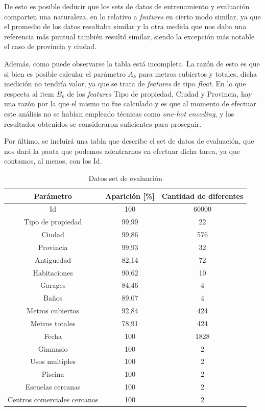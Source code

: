 \documentclass[titlepage,a4paper,11pt]{article}
\begin{document}
De esto es posible deducir que los sets de datos de entrenamiento y evaluación comparten una naturaleza, en lo relativo a \textit{features} en cierto modo similar, ya que el promedio de los datos resultaba similar y la otra medida que nos daba una referencia más puntual también resultó similar, siendo la excepción más notable el caso de provincia y ciudad. 

Además, como puede observarse la tabla está incompleta. La razón de esto es que si bien es posible calcular el parámetro $A_{k}$ para metros cubiertos y totales, dicha medición no tendría valor, ya que se trata de \textit{features} de tipo \textit{float}. En lo que respecta al item $B_{k}$ de los \textit{features} Tipo de propiedad, Ciudad y Provincia, hay una razón por la que el mismo no fue calculado y es que al momento de efectuar este análisis no se habían empleado técnicas como \textit{one-hot encoding}, y los resultados obtenidos se consideraron suficientes para proseguir.

Por último, se incluirá una tabla que describe el set de datos de evaluación, que nos dará la pauta que podemos adentrarnos en efectuar dicha tarea, ya que contamos, al menos, con los Id.

\begin{table}[h]
	\begin{center}
		\begin{tabular}{|c|c|c|}
			\hline
			Parámetro & Aparición [\%] & Cantidad de diferentes \\
			\hline \hline
			Id & 100 & 60000 \\ \hline
			Tipo de propiedad & 99,99 & 22  \\ \hline
			Ciudad  & 99,86 & 576  \\ \hline
			Provincia & 99,93 & 32  \\ \hline
			Antiguedad & 82,14 & 72  \\ \hline
			Habitaciones & 90,62 & 10  \\ \hline
			Garages & 84,46 & 4  \\ \hline
			Baños & 89,07 & 4 \\ \hline
			Metros cubiertos & 92,84 & 424  \\ \hline
			Metros totales & 78,91 & 424  \\ \hline
			Fecha & 100 & 1828  \\ \hline
			Gimnasio & 100 & 2  \\ \hline
			Usos multiples & 100 & 2  \\ \hline
			Piscina & 100 & 2 \\ \hline
			Escuelas cercanas & 100 & 2 \\ \hline
			Centros comerciales cercanos & 100 & 2 \\ \hline
		\end{tabular}
		\caption{Datos set de evaluación}
		\label{tabla:sencilla}
	\end{center}
\end{table}
\end{document}
